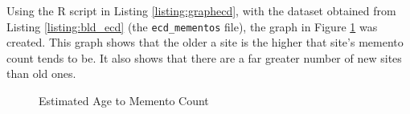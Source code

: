 

Using the R script in Listing \ref{listing:graphecd}, with the dataset obtained from Listing \ref{listing:bld_ecd} (the {\tt ecd\_mementos} file), the graph in Figure \ref{fig:ecdgraph} was created. This graph shows that the older a site is the higher that site's memento count tends to be. It also shows that there are a far greater number of new sites than old ones.



\begin{figure}[h!]
\centering
{}
\caption{Estimated Age to Memento Count}
\label{fig:ecdgraph}
\end{figure}